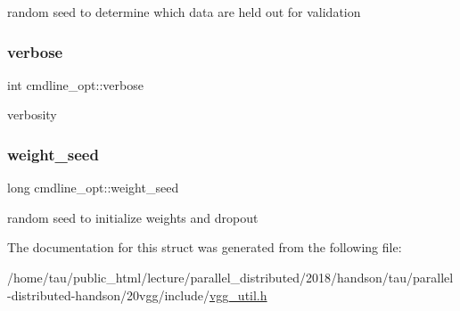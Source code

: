 random seed to determine which data are held out for validation \mbox{\label{structcmdline__opt_a2212d80547e3ae3504942006440f7285}} 
\subsubsection{\texorpdfstring{verbose}{verbose}}
{\footnotesize\ttfamily int cmdline\+\_\+opt\+::verbose}

verbosity \mbox{\label{structcmdline__opt_a70133aad1b243d44e1be18be81633939}} 
\subsubsection{\texorpdfstring{weight\+\_\+seed}{weight\_seed}}
{\footnotesize\ttfamily long cmdline\+\_\+opt\+::weight\+\_\+seed}

random seed to initialize weights and dropout 

The documentation for this struct was generated from the following file\+:\begin{DoxyCompactItemize}
\item 
/home/tau/public\+\_\+html/lecture/parallel\+\_\+distributed/2018/handson/tau/parallel-\/distributed-\/handson/20vgg/include/\hyperlink{vgg__util_8h}{vgg\+\_\+util.\+h}\end{DoxyCompactItemize}
